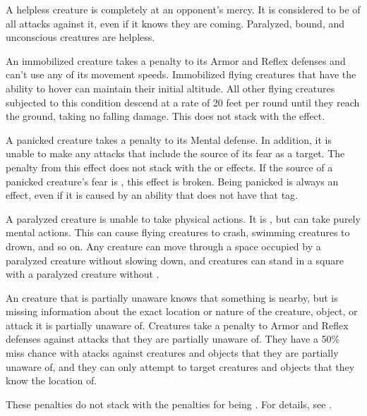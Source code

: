      A helpless creature is completely at an opponent's mercy.
    It is considered to be \unaware of all attacks against it, even if it knows they are coming.
    Paralyzed, bound, and unconscious creatures are helpless.

     An immobilized creature takes a  penalty to its Armor and Reflex defenses and can't use any of its movement speeds.
    Immobilized flying creatures that have the ability to hover can maintain their initial altitude.
    All other flying creatures subjected to this condition descend at a rate of 20 feet per round until they reach the ground, taking no falling damage.
    This does not stack with the \slowed effect.

     A panicked creature takes a  penalty to its Mental defense.
    In addition, it is unable to make any attacks that include the source of its fear as a target.
    The penalty from this effect does not stack with the \frightened or \panicked effects.
    If the source of a panicked creature's fear is , this effect is broken.
    Being panicked is always an  effect, even if it is caused by an ability that does not have that tag.

     A paralyzed creature is unable to take physical actions. It is \helpless, but can take purely mental actions. This can cause flying creatures to crash, swimming creatures to drown, and so on. Any creature can move through a space occupied by a paralyzed creature without slowing down, and creatures can stand in a square with a paralyzed creature without \squeezing.

     An creature that is partially unaware knows that something is nearby, but is missing information about the exact location or nature of the creature, object, or attack it is partially unaware of.
    Creatures take a  penalty to Armor and Reflex defenses against attacks that they are partially unaware of.
    They have a 50\% miss chance with  atacks against creatures and objects that they are partially unaware of, and they can only attempt to target creatures and objects that they know the location of.

    These penalties do not stack with the penalties for being \unaware.
    For details, see .

